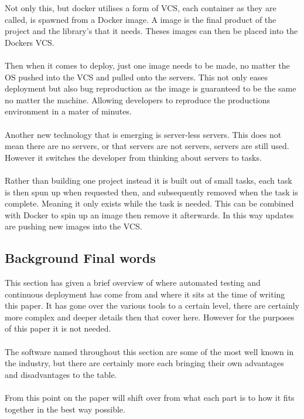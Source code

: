 Not only this, but docker utilises a form of VCS, each container as they are called, is spawned from a Docker image. A image is the final product of the project and the library's that it needs. Theses images can then be placed into the Dockers VCS.
\\\\
Then when it comes to deploy, just one image needs to be made, no matter the OS pushed into the VCS and pulled onto the servers. This not only eases deployment but also bug reproduction as the image is guaranteed to be the same no matter the machine. Allowing developers to reproduce the productions environment in a mater of minutes. 
\\\\
Another new technology that is emerging is server-less servers. This does not mean there are no servers, or that servers are not servers, servers are still used. However it switches the developer from thinking about servers to tasks.
\\\\
Rather than building one project instead it is built out of small tasks, each task is then spun up when requested then, and subsequently removed when the task is complete. Meaning it only exists while the task is needed. This can be combined with Docker to spin up an image then remove it afterwards. In this way updates are pushing new images into the VCS.

\subsection{Background Final words}

This section has given a brief overview of where automated testing and continuous deployment has come from and where it sits at the time of writing this paper. It has gone over the various tools to a certain level, there are certainly more complex and deeper details then that cover here. However for the purposes of this paper it is not needed.
\\\\
The software named throughout this section are some of the most well known in the industry, but there are certainly more each bringing their own advantages and disadvantages to the table.
\\\\
From this point on the paper will shift over from what each part is to how it fits together in the best way possible.